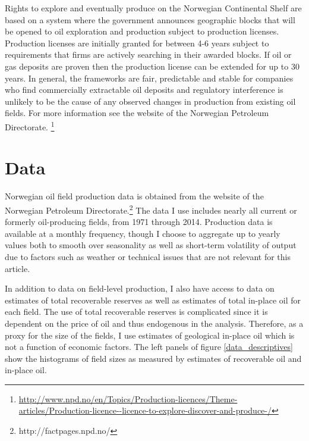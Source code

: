 \documentclass[12pt]{article}
\begin{document}
Rights to explore and eventually produce on the Norwegian Continental Shelf are based on a system where the government announces geographic blocks that will be opened to oil exploration and production subject to production licenses.  Production licenses are initially granted for between 4-6 years subject to requirements that firms are actively searching in their awarded blocks.  If oil or gas deposits are proven then the production license can be extended for up to 30 years.  In general, the frameworks are fair, predictable and stable for companies who find commercially extractable oil deposits and regulatory interference is unlikely to be the cause of any observed changes in production from existing oil fields.  For more information see the website of the Norwegian Petroleum Directorate. \footnote{\url{http://www.npd.no/en/Topics/Production-licences/Theme-articles/Production-licence--licence-to-explore-discover-and-produce-/}}

\section{Data}
Norwegian oil field production data is obtained from the website of the Norwegian Petroleum Directorate.\footnote{http://factpages.npd.no/} The data I use includes nearly all current or formerly oil-producing fields, from 1971 through 2014. Production data is available at a monthly frequency, though I choose to aggregate up to yearly values both to smooth over seasonality as well as short-term volatility of output due to factors such as weather or technical issues that are not relevant for this article. 

In addition to data on field-level production, I also have access to data on estimates of total recoverable reserves as well as estimates of total in-place oil for each field. The use of total recoverable reserves is complicated since it is dependent on the price of oil and thus endogenous in the analysis. Therefore, as a proxy for the size of the fields, I use estimates of geological in-place oil which is not a function of economic factors. The left panels of figure \ref{data_descriptives} show the histograms of field sizes as measured by estimates of recoverable oil and in-place oil. 
\end{document}
